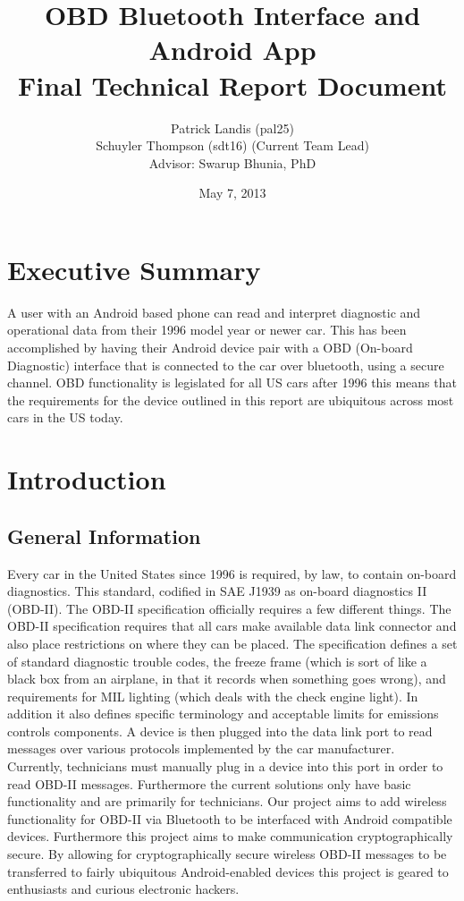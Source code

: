 \documentclass[12pt,letterpaper]{article}
\title{
\textbf{\LARGE OBD Bluetooth Interface and Android App} \\
\Large Final Technical Report Document
}
\author{
\normalsize Patrick Landis (pal25) \\
\normalsize Schuyler Thompson (sdt16) (Current Team Lead) \\
\normalsize Advisor: Swarup Bhunia, PhD
}
\date{\normalsize May 7, 2013}
\begin{document}
\maketitle

\section*{Executive Summary}
A user with an Android based phone can read and interpret diagnostic and operational data from their 1996 model year or newer car. This has been accomplished by having their Android device pair with a OBD (On-board Diagnostic) interface that is connected to the car over bluetooth, using a secure channel. OBD functionality is legislated for all US cars after 1996 this means that the requirements for the device outlined in this report are ubiquitous across most cars in the US today.

\newpage

\tableofcontents

\newpage

\section{Introduction}
\subsection{General Information}
Every car in the United States since 1996 is required, by law, to contain on-board diagnostics. This standard, codified in SAE J1939 as on-board diagnostics II (OBD-II). The OBD-II specification officially requires a few different things. The OBD-II specification requires that all cars make available data link connector and also place restrictions on where they can be placed. The specification defines a set of standard diagnostic trouble codes, the freeze frame (which is sort of like a black box from an airplane, in that it records when something goes wrong), and requirements for MIL lighting (which deals with the check engine light). In addition it also defines specific terminology and acceptable limits for emissions controls components. A device is then plugged into the data link port to read messages over various protocols implemented by the car manufacturer. \\

Currently, technicians must manually plug in a device into this port in order to read OBD-II messages. Furthermore the current solutions only have basic functionality and are primarily for technicians. Our project aims to add wireless functionality for OBD-II via Bluetooth to be interfaced with Android compatible devices. Furthermore this project aims to make communication cryptographically secure. By allowing for cryptographically secure wireless OBD-II messages to be transferred to fairly ubiquitous Android-enabled devices this project is geared to enthusiasts and curious electronic hackers. \\
\end{document}
